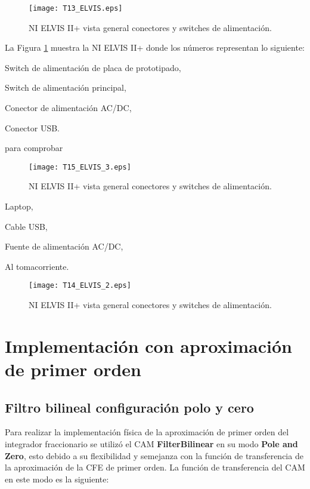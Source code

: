 \begin{figure}[!hbp] 
\caption{NI ELVIS II+ vista general conectores y switches de alimentación.}
\label{fig:T13_ELVIS.eps}
\centering
\texttt{[image: T13\_ELVIS.eps]}
\end{figure}
La Figura \ref{fig:T13_ELVIS.eps} muestra la NI ELVIS II+ donde los números representan lo siguiente:  
\begin{enumerate*}
   	\item Switch de alimentación de placa de prototipado,
	\item Switch de alimentación principal,
	\item Conector de alimentación AC/DC,
	\item Conector USB.
\end{enumerate*}
para comprobar 
\begin{figure}[!hbp] 
\caption{NI ELVIS II+ vista general conectores y switches de alimentación.}
\label{fig:T15_ELVIS_3.eps}
\centering
\texttt{[image: T15\_ELVIS\_3.eps]}
\end{figure}

\begin{enumerate*}
  	\item Laptop,
	\item Cable USB,
	\item Fuente de alimentación AC/DC,
	\item Al tomacorriente.
\end{enumerate*}

\begin{figure}[!hbp] 
\caption{NI ELVIS II+ vista general conectores y switches de alimentación.}
\label{fig:T14_ELVIS_2.eps}
\centering
\texttt{[image: T14\_ELVIS\_2.eps]}
\end{figure}

\section{Implementación con aproximación de primer orden}
	
	\subsection{Filtro bilineal configuración polo y cero}
	
	Para realizar la implementación física de la aproximación de primer orden del integrador fraccionario se utilizó el CAM \textbf{FilterBilinear} en su modo \textbf{Pole and Zero}, esto debido a su flexibilidad y semejanza con la función de transferencia de la aproximación de la CFE de primer orden. La función de transferencia del CAM en este modo es la siguiente:
	
